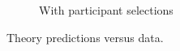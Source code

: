 \documentclass{article}
\begin{document}
\begin{figure}[h!]
\begin{subfigure}[t]{0.45\textwidth}
    \caption{With participant selections}
  \end{subfigure}
  \caption{Theory predictions versus data.}
  \label{fig:theory_comp}
\end{figure}
\end{document}
